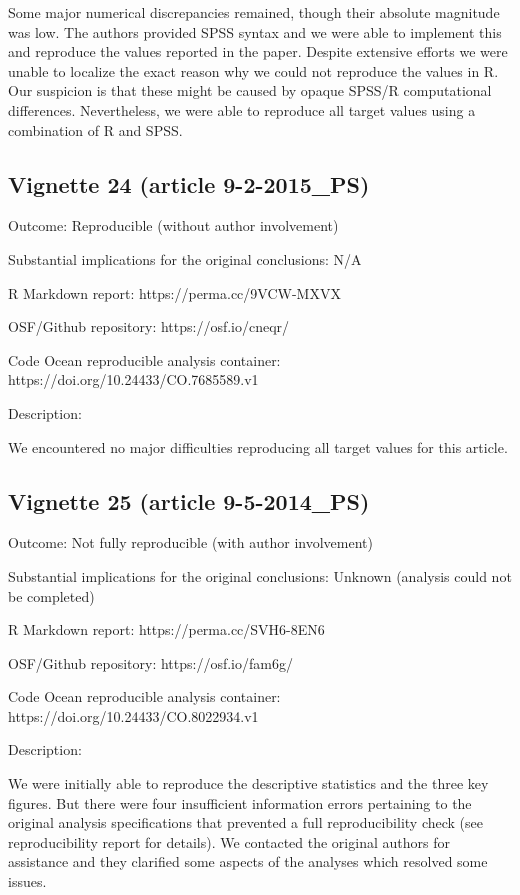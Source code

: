 \begin{appendix}
Some major numerical discrepancies remained, though their absolute
magnitude was low. The authors provided SPSS syntax and we were able to
implement this and reproduce the values reported in the paper. Despite
extensive efforts we were unable to localize the exact reason why we
could not reproduce the values in R. Our suspicion is that these might
be caused by opaque SPSS/R computational differences. Nevertheless, we
were able to reproduce all target values using a combination of R and
SPSS.

\hypertarget{vignette-24-article-9-2-2015_ps}{%
\subsection{Vignette 24 (article
9-2-2015\_PS)}\label{vignette-24-article-9-2-2015_ps}}

Outcome: Reproducible (without author involvement)

Substantial implications for the original conclusions: N/A

R Markdown report: https://perma.cc/9VCW-MXVX

OSF/Github repository: https://osf.io/cneqr/

Code Ocean reproducible analysis container:
https://doi.org/10.24433/CO.7685589.v1

Description:

We encountered no major difficulties reproducing all target values for
this article.

\hypertarget{vignette-25-article-9-5-2014_ps}{%
\subsection{Vignette 25 (article
9-5-2014\_PS)}\label{vignette-25-article-9-5-2014_ps}}

Outcome: Not fully reproducible (with author involvement)

Substantial implications for the original conclusions: Unknown (analysis
could not be completed)

R Markdown report: https://perma.cc/SVH6-8EN6

OSF/Github repository: https://osf.io/fam6g/

Code Ocean reproducible analysis container:
https://doi.org/10.24433/CO.8022934.v1

Description:

We were initially able to reproduce the descriptive statistics and the
three key figures. But there were four insufficient information errors
pertaining to the original analysis specifications that prevented a full
reproducibility check (see reproducibility report for details). We
contacted the original authors for assistance and they clarified some
aspects of the analyses which resolved some issues.


\end{appendix}
